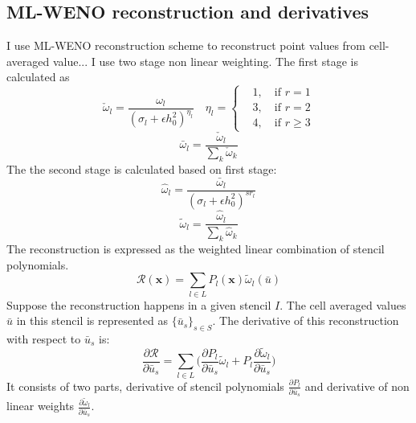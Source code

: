 \documentclass[smallextended]{svjour3}       %
\newcommand{\bfx}{{\mathbf x}}
\begin{document}
\subsection{ML-WENO reconstruction and derivatives}
I use ML-WENO reconstruction scheme to reconstruct point values
from cell-averaged value...
I use two stage non linear weighting. The first stage is
calculated as
\begin{equation}\label{eq:fstage}
		  \check \omega_l = \frac{\omega_l}{(\sigma_l + \epsilon h^2_0)^{\eta_l}} 
		  \quad \eta_l = \left \{\begin{aligned}
					 &1, \quad \text{if } r=1\\
					 &3, \quad \text{if } r=2\\
					 &4, \quad \text{if } r\geq 3
		  \end{aligned}
		  \right .
\end{equation}
\begin{equation}\label{eq:fstagenorm}
		  \bar \omega_l = \frac{\check \omega_l}{\sum_k \check \omega_k}
\end{equation}
The the second stage is calculated based on first stage:
\begin{equation}\label{eq:sstage}
		  \hat \omega_l = \frac{\bar \omega_l}{(\sigma_l + \epsilon h^2_0)^{sr_l}}
\end{equation}
\begin{equation}\label{eq:sstagenorm}
		  \tilde \omega_l = \frac{\hat \omega_l}{\sum_k \hat \omega_k}
\end{equation}
The reconstruction is expressed as the weighted linear combination of 
stencil polynomials.
\begin{equation}\label{eq:weno}
		  \mathscr{R}(\bfx) = \sum_{l\in L} P_l(\bfx) \tilde\omega_l(\bar u)
\end{equation}
Suppose the reconstruction happens in a given stencil $I$. 
The cell averaged values $\bar u$ in this stencil is represented as $\{\bar u_s\}_{s \in S}$.
The derivative of this reconstruction with respect to $\bar u_s$ is:
\begin{equation}\label{eq:derivR}
		  \frac{\partial \mathscr{R}}{\partial \bar u_s} = 
		  \sum_{l \in L} \Big(\frac{\partial P_l}{\partial \bar u_s}\tilde \omega_l + P_l\frac{\partial \tilde \omega_l}{\partial \bar u_s}\Big) 
\end{equation}
It consists of two parts, derivative of stencil polynomials $\frac{\partial P_l}{\partial \bar u_s}$ and 
derivative of non linear weights $\frac{\partial \tilde \omega_l}{\partial \bar u_s}$.
\end{document}
